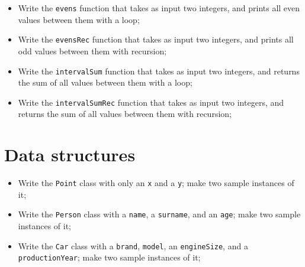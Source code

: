 \begin{itemize}
            \item Write the \texttt{evens} function that takes as input two integers, and prints all even values between them with a loop;
            \item Write the \texttt{evensRec} function that takes as input two integers, and prints all odd values between them with recursion;
            \item Write the \texttt{intervalSum} function that takes as input two integers, and returns the sum of all values between them with a loop;
            \item Write the \texttt{intervalSumRec} function that takes as input two integers, and returns the sum of all values between them with recursion;
        \end{itemize}

    \section{Data structures}
		\begin{itemize}
			\item Write the \texttt{Point} class with only an \texttt{x} and a \texttt{y}; make two sample instances of it;
			\item Write the \texttt{Person} class with a \texttt{name}, a \texttt{surname}, and an \texttt{age}; make two sample instances of it;
			\item Write the \texttt{Car} class with a \texttt{brand}, \texttt{model}, an \texttt{engineSize}, and a \texttt{productionYear}; make two sample instances of it;
		\end{itemize}
		
